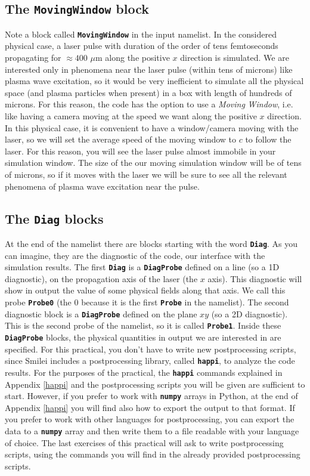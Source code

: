 \documentclass[a4paper,12pt]{extarticle}
\newcommand{\smilei}{{\sc Smilei}\xspace}
\newcommand{\commandline}[1]{\texttt{\textbf{#1}}}
\begin{document}
\subsection*{The \commandline{MovingWindow} block}
Note a block called \commandline{MovingWindow} in the input namelist. In the considered physical case,  a laser pulse with duration of the order of tens femtoseconds propagating for $\approx 400$ $\mu$m along the positive $x$ direction is simulated. We are interested only in phenomena near the laser pulse (within tens of microns) like plasma wave excitation, so it would be very inefficient to simulate all the physical space (and plasma particles when present) in a box with length of hundreds of microns. For this reason, the code has the option to use a \emph{Moving} \emph{Window}, i.e. like having a camera moving at the speed we want  along the positive $x$ direction. In this physical case, it is convenient to have a window/camera moving with the laser, so we will set the average speed of the moving window to $c$ to follow the laser. For this reason, you will see the laser pulse almost immobile in your simulation window. The size of the our moving simulation window will be of tens of microns, so if it moves with the laser we will be sure to see all the relevant phenomena of plasma wave excitation near the pulse.

\subsection*{The \commandline{Diag} blocks}
At the end of the namelist there are blocks starting with the word \commandline{Diag}. As you can imagine, they are the diagnostic of the code, our interface with the simulation results. The first \commandline{Diag} is a \commandline{DiagProbe} defined on a line (so a 1D diagnostic), on the propagation axis of the laser (the $x$ axis). This diagnostic will show in output the value of some physical fields along that axis. We call this probe \commandline{Probe0} (the 0 because it is the first \commandline{Probe} in the namelist). The second diagnostic block is a \commandline{DiagProbe} defined on the plane $xy$ (so a 2D diagnostic). This is the second probe of the namelist, so it is called \commandline{Probe1}. Inside these \commandline{DiagProbe} blocks, the physical quantities in output we are interested in are specified. For this practical, you don't have to write new postprocessing scripts, since \smilei includes a postprocessing library, called \commandline{happi}, to analyze the code results. For the purposes of the practical, the \commandline{happi} commands explained in Appendix \ref{happi} and the postprocessing scripts you will be given are sufficient to start. However, if you prefer to work with \commandline{numpy} arrays in Python, at the end of Appendix \ref{happi} you will find also how to export the output to that format. If you prefer to work with other languages for postprocessing, you can export the data to a \commandline{numpy} array and then write them to a file readable with your language of choice.
The last exercises of this practical will ask to write postprocessing scripts, using the commands you will find in the already provided postprocessing scripts.
\end{document}
